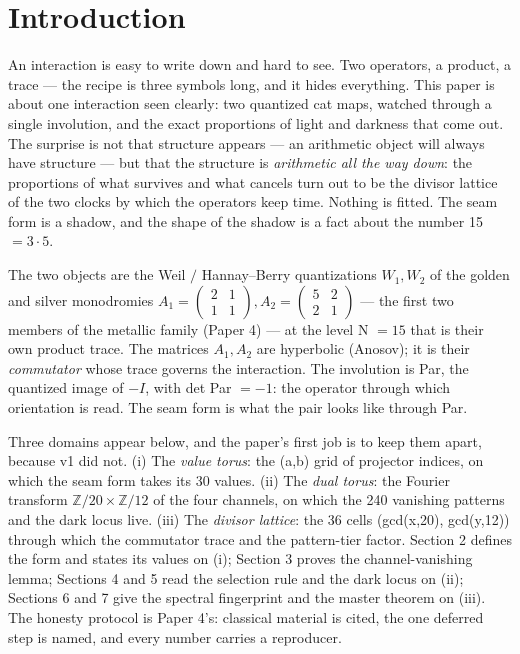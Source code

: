 \documentclass[11pt]{article}
\theoremstyle{plain}
\theoremstyle{definition}
\theoremstyle{remark}
\begin{document}
\section{Introduction}

An interaction is easy to write down and hard to see. Two operators, a product, a trace — the recipe is three symbols long, and it hides everything. This paper is about one interaction seen clearly: two quantized cat maps, watched through a single involution, and the exact proportions of light and darkness that come out. The surprise is not that structure appears — an arithmetic object will always have structure — but that the structure is \emph{arithmetic all the way down}: the proportions of what survives and what cancels turn out to be the divisor lattice of the two clocks by which the operators keep time. Nothing is fitted. The seam form is a shadow, and the shape of the shadow is a fact about the number 15 \(= 3\cdot 5\).

The two objects are the Weil \(/\) Hannay–Berry quantizations \(W_{1}, W_{2}\) of the golden and silver monodromies \(A_{1} = \left(\begin{smallmatrix}2 & 1\\1 & 1\end{smallmatrix}\right), A_{2} = \left(\begin{smallmatrix}5 & 2\\2 & 1\end{smallmatrix}\right)\) — the first two members of the metallic family (Paper 4) — at the level N \(= 15\) that is their own product trace. The matrices \(A_{1}, A_{2}\) are hyperbolic (Anosov); it is their \emph{commutator} whose trace governs the interaction. The involution is Par, the quantized image of \(-I\), with det Par \(= -1\): the operator through which orientation is read. The seam form is what the pair looks like through Par.

Three domains appear below, and the paper's first job is to keep them apart, because v1 did not. (i) The \emph{value torus}: the (a,b) grid of projector indices, on which the seam form takes its 30 values. (ii) The \emph{dual torus}: the Fourier transform \(\mathbb{Z}/20 \times  \mathbb{Z}/12\) of the four channels, on which the 240 vanishing patterns and the dark locus live. (iii) The \emph{divisor lattice}: the 36 cells (gcd(x,20), gcd(y,12)) through which the commutator trace and the pattern-tier factor. Section 2 defines the form and states its values on (i); Section 3 proves the channel-vanishing lemma; Sections 4 and 5 read the selection rule and the dark locus on (ii); Sections 6 and 7 give the spectral fingerprint and the master theorem on (iii). The honesty protocol is Paper 4's: classical material is cited, the one deferred step is named, and every number carries a reproducer.
\end{document}
